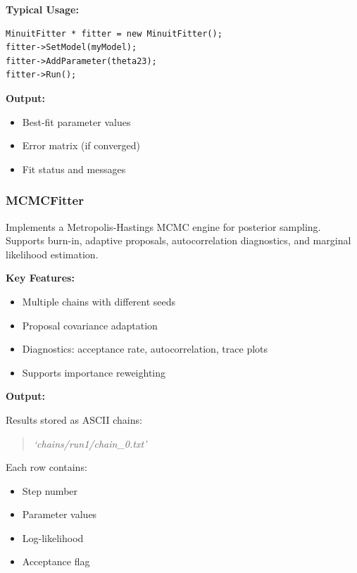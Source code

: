 \noindent\textbf{Typical Usage:}

\begin{lstlisting}
MinuitFitter * fitter = new MinuitFitter();
fitter->SetModel(myModel);
fitter->AddParameter(theta23);
fitter->Run();
\end{lstlisting}

\vspace{0.5em}
\noindent\textbf{Output:}
\begin{itemize}
  \item Best-fit parameter values
  \item Error matrix (if converged)
  \item Fit status and messages
\end{itemize}

\vspace{1em}
\subsubsection*{\color{cadmiumgreen}\bf MCMCFitter}

Implements a Metropolis-Hastings MCMC engine for posterior sampling.  
Supports burn-in, adaptive proposals, autocorrelation diagnostics, and marginal likelihood estimation.

\vspace{0.5em}
\noindent\textbf{Key Features:}

\begin{itemize}
  \item Multiple chains with different seeds
  \item Proposal covariance adaptation
  \item Diagnostics: acceptance rate, autocorrelation, trace plots
  \item Supports importance reweighting
\end{itemize}

\vspace{0.5em}
\noindent\textbf{Output:}

Results stored as ASCII chains:

\begin{quote}
{\it`chains/run1/chain\_0.txt'}
\end{quote}

Each row contains:

\begin{itemize}
  \item Step number
  \item Parameter values
  \item Log-likelihood
  \item Acceptance flag
\end{itemize}

